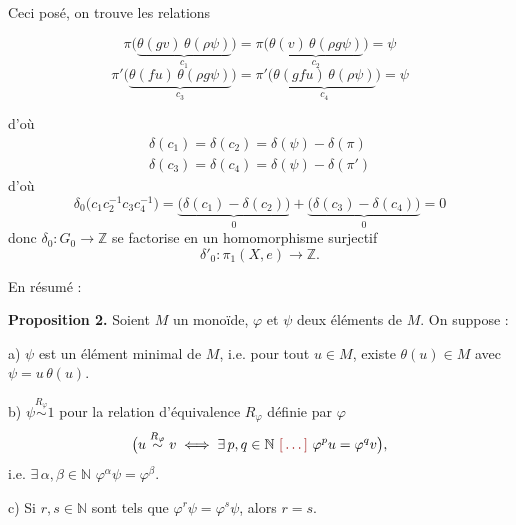 \documentclass[11pt,a4paper]{article}
\begin{document}

Ceci posé, on trouve les relations


\[
  \pi\bigl(\underbrace{\theta(gv)\,\theta(\rho\psi)}_{c_1}\bigr)
  = \pi\bigl(\underbrace{\theta(v)\,\theta(\rho g\psi)}_{c_2}\bigr) = \psi
\]
\[
  \pi'\bigl(\underbrace{\theta(fu)\,\theta(\rho g\psi)}_{c_3}\bigr)
  = \pi'\bigl(\underbrace{\theta(gfu)\,\theta(\rho\psi)}_{c_4}\bigr) = \psi
\]


d'où
\[
  \begin{array}{l}
    \delta(c_1) = \delta(c_2) = \delta(\psi) - \delta(\pi) \\
    \delta(c_3) = \delta(c_4) = \delta(\psi) - \delta(\pi')
  \end{array}
\]
d'où
\[
  \delta_0\bigl(c_1 c_2^{-1} c_3 c_4^{-1}\bigr)
  = \underbrace{\bigl(\delta(c_1) - \delta(c_2)\bigr)}_{0}
  + \underbrace{\bigl(\delta(c_3) - \delta(c_4)\bigr)}_{0} = 0
\]
donc  $\delta_0 : G_0 \longrightarrow \mathbb{Z}$
se factorise en un homomorphisme surjectif
\[
  \delta'_0 : \pi_1(X,e) \longrightarrow \mathbb{Z} .
\]


En résumé :

\textbf{Proposition 2.} Soient $M$ un monoïde, \struck{\ill{}}
 $\varphi$ et $\psi$ deux éléments de $M$. On suppose :

a) $\psi$ est un élément minimal de $M$, i.e. pour tout $u \in M$, existe
$\theta(u) \in M$ avec $\psi = u\,\theta(u)$.

b) $\psi \overset{R_\varphi}{\sim} 1$ pour la relation d'équivalence \ill{}
$R_\varphi$ définie par $\varphi$
\[
  \bigl(u \overset{R_\varphi}{\sim} v \iff \exists\, p,q \in \mathbb{N}
  \ \ill{}\ \varphi^{p}u = \varphi^{q}v\bigr),
\]
i.e. $\exists\, \alpha,\beta \in \mathbb{N}$ \ill{}
$\varphi^{\alpha}\psi = \varphi^{\beta}$\struck{$\psi$}.

c) Si $r,s \in \mathbb{N}$ sont tels que $\varphi^{r}\psi = \varphi^{s}\psi$,
alors $r = s$.
\end{document}
